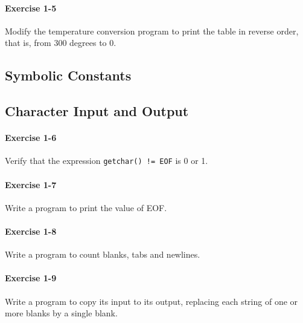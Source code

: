 		\paragraph{Exercise 1-5}
			Modify the temperature conversion program to print the table in reverse
			order, that is, from 300 degrees to 0.

			\hfill{}\cite[p.~14]{knr}
			

	\subsection{Symbolic Constants}
	\subsection{Character Input and Output}
		\paragraph{Exercise 1-6}
			Verify that the expression \lstinline{getchar() != EOF} is 0 or 1.

			\hfill{}\cite[p.~17]{knr}
			

		\paragraph{Exercise 1-7}
			Write a program to print the value of EOF.

			\hfill{}\cite[p.~17]{knr}
			

		\paragraph{Exercise 1-8}
			Write a program to count blanks, tabs and newlines.

			\hfill{}\cite[p.~20]{knr}
			

		\paragraph{Exercise 1-9}
			Write a program to copy its input to its output, replacing each string
			of one or more blanks by a single blank.

			\hfill{}\cite[p.~20]{knr}
			

